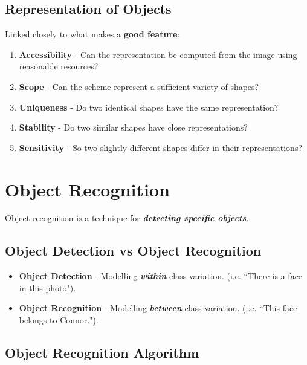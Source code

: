 \documentclass[english, 10pt]{article}
\begin{document}
\subsection{Representation of Objects}

Linked closely to what makes a \textbf{good feature}:

\begin{enumerate}
\item \textbf{Accessibility} - Can the representation be computed from the image using reasonable resources?
\item \textbf{Scope} - Can the scheme represent a sufficient variety of shapes?
\item \textbf{Uniqueness} - Do two identical shapes have the same representation?
\item \textbf{Stability} - Do two similar shapes have close representations?
\item \textbf{Sensitivity} - So two slightly different shapes differ in their representations?
\end{enumerate}

\section{Object Recognition}

Object recognition is a technique for \textbf{\textit{detecting specific objects}}.

\subsection{Object Detection vs Object Recognition}

\begin{itemize}
\item \textbf{Object Detection} - Modelling \textit{\textbf{within}} class variation. (i.e. ``There is a face in this photo").
\item \textbf{Object Recognition} - Modelling \textit{\textbf{between}} class variation. (i.e. ``This face belongs to Connor.").
\end{itemize}

\subsection{Object Recognition Algorithm}
\end{document}
